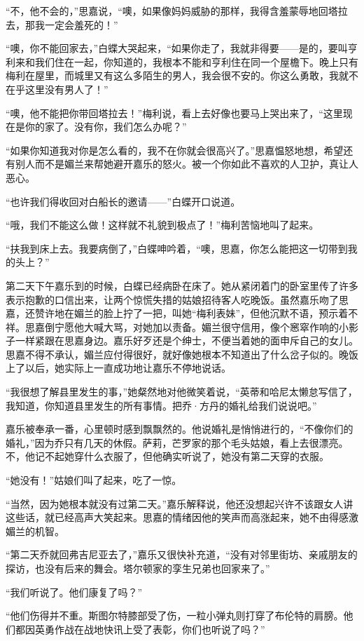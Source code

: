 \par “不，他不会的，”思嘉说，“噢，如果像妈妈威胁的那样，我得含羞蒙辱地回塔拉去，那我一定会羞死的！”
\par “噢，你不能回家去，”白蝶大哭起来，“如果你走了，我就非得要——是的，要叫亨利来和我们住在一起，你知道的，我根本不能和亨利住在同一个屋檐下。晚上只有梅利在屋里，而城里又有这么多陌生的男人，我会很不安的。你这么勇敢，我就不在乎这里没有男人了！”
\par “噢，他不能把你带回塔拉去！”梅利说，看上去好像也要马上哭出来了，“这里现在是你的家了。没有你，我们怎么办呢？”
\par “如果你知道我对你是怎么看的，我不在你就会很高兴了。”思嘉愠怒地想，希望还有别人而不是媚兰来帮她避开嘉乐的怒火。被一个你如此不喜欢的人卫护，真让人恶心。
\par “也许我们得收回对白船长的邀请——”白蝶开口说道。
\par “哦，我们不能这么做！这样就不礼貌到极点了！”梅利苦恼地叫了起来。
\par “扶我到床上去。我要病倒了，”白蝶呻吟着，“噢，思嘉，你怎么能把这一切带到我的头上？”
\par 第二天下午嘉乐到的时候，白蝶已经病卧在床了。她从紧闭着门的卧室里传了许多表示抱歉的口信出来，让两个惊慌失措的姑娘招待客人吃晚饭。虽然嘉乐吻了思嘉，还赞许地在媚兰的脸上拧了一把，叫她“梅利表妹”，但他沉默不语，预示着不祥。思嘉倒宁愿他大喊大骂，对她加以责备。媚兰很守信用，像个窸窣作响的小影子一样紧跟在思嘉身边。嘉乐好歹还是个绅士，不便当着她的面申斥自己的女儿。思嘉不得不承认，媚兰应付得很好，就好像她根本不知道出了什么岔子似的。晚饭上了以后，她实际上一直成功地让嘉乐不停地说话。
\par “我很想了解县里发生的事，”她粲然地对他微笑着说，“英蒂和哈尼太懒怠写信了，我知道，你知道县里发生的所有事情。把乔·方丹的婚礼给我们说说吧。”
\par 嘉乐被奉承一番，心里顿时感到飘飘然的。他说婚礼是悄悄进行的，“不像你们的婚礼，”因为乔只有几天的休假。萨莉，芒罗家的那个毛头姑娘，看上去很漂亮。不，他记不起她穿什么衣服了，但他确实听说了，她没有第二天穿的衣服。
\par “她没有！”姑娘们叫了起来，吃了一惊。
\par “当然，因为她根本就没有过第二天。”嘉乐解释说，他还没想起兴许不该跟女人讲这些话，就已经高声大笑起来。思嘉的情绪因他的笑声而高涨起来，她不由得感激媚兰的机智。
\par “第二天乔就回弗吉尼亚去了，”嘉乐又很快补充道，“没有对邻里街坊、亲戚朋友的探访，也没有后来的舞会。塔尔顿家的孪生兄弟也回家来了。”
\par “我们听说了。他们康复了吗？”
\par “他们伤得并不重。斯图尔特膝部受了伤，一粒小弹丸则打穿了布伦特的肩膀。他们都因英勇作战在战地快讯上受了表彰，你们也听说了吗？”
